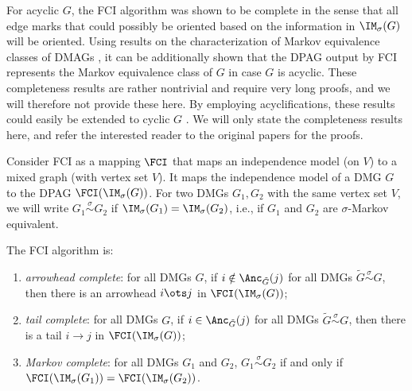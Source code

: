 For acyclic $G$, the FCI algorithm was shown to be complete \cite{Zhang2008_AI} in the sense that all edge marks that could possibly be oriented based on the information in $\IM_\sigma(G)$ will be oriented.
Using results on the characterization of Markov equivalence classes of DMAGs \cite{Ali++2005}, it can be additionally shown that the DPAG output by FCI represents the Markov equivalence class of $G$ in case $G$ is acyclic.
These completeness results are rather nontrivial and require very long proofs, and we will therefore not provide these here.
By employing acyclifications, these results could easily be extended to cyclic $G$ \cite{MooijClaassen_UAI_20}.
We will only state the completeness results here, and refer the interested reader to the original papers for the proofs.

Consider FCI as a mapping $\FCI$ that maps an independence model (on $V$) to a mixed graph (with vertex set $V$).
It maps the independence model of a DMG $G$ to the DPAG $\FCI(\IM_\sigma(G))$.
For two DMGs $G_1,G_2$ with the same vertex set $V$, we will write $G_1 \stackrel{\sigma}{\sim} G_2$ if $\IM_\sigma(G_1) = \IM_\sigma(G_2)$, i.e., if $G_1$ and $G_2$ are $\sigma$-Markov equivalent.
\begin{Thm}\label{thm:fci_sound_complete}
The FCI algorithm is:
  \begin{enumerate}[label=(\roman*)]
    \item \emph{arrowhead complete}: for all DMGs $G$, if $i \notin \Anc_{\tilde{G}}(j)$ for all DMGs $\tilde{G} \stackrel{\sigma}{\sim} G$, then there is an arrowhead $i \ots j$ in $\FCI(\IM_\sigma(G))$;
    \item \emph{tail complete}: for all DMGs $G$, if $i \in \Anc_{\tilde{G}}(j)$ for all DMGs $\tilde{G} \stackrel{\sigma}{\sim} G$, then there is a tail $i \to j$ in $\FCI(\IM_\sigma(G))$;
    \item \emph{Markov complete}: for all DMGs $G_1$ and $G_2$, $G_1 \stackrel{\sigma}{\sim} G_2$ if and only if $\FCI(\IM_\sigma(G_1)) = \FCI(\IM_\sigma(G_2))$.
  \end{enumerate}
\end{Thm}
